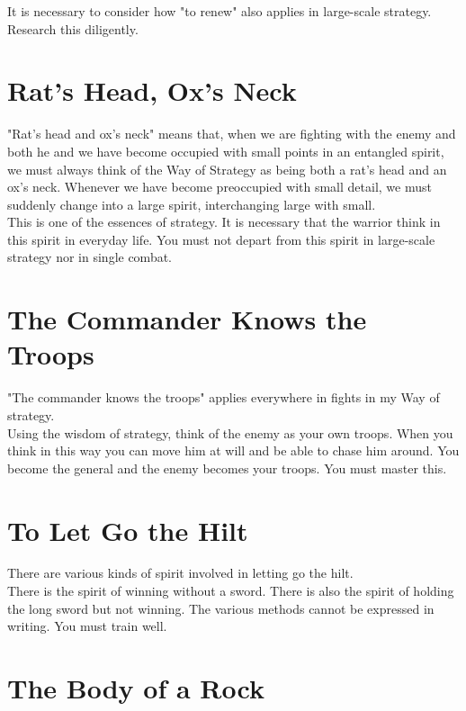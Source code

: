It is necessary to consider how "to renew" also applies in large-scale strategy. Research this diligently.\\
\section{Rat's Head, Ox's Neck}

"Rat's head and ox's neck" means that, when we are fighting with the enemy and both he and we have become occupied with small points in an entangled spirit, we must always think of the Way of Strategy as being both a rat's head and an ox's neck. Whenever we have become preoccupied with small detail, we must suddenly change into a large spirit, interchanging large with small.\\

This is one of the essences of strategy. It is necessary that the warrior think in this spirit in everyday life. You must not depart from this spirit in large-scale strategy nor in single combat.\\
\section{The Commander Knows the Troops}

"The commander knows the troops" applies everywhere in fights in my Way of strategy.\\

Using the wisdom of strategy, think of the enemy as your own troops. When you think in this way you can move him at will and be able to chase him around. You become the general and the enemy becomes your troops. You must master this.\\
\section{To Let Go the Hilt}

There are various kinds of spirit involved in letting go the hilt.\\

There is the spirit of winning without a sword. There is also the spirit of holding the long sword but not winning. The various methods cannot be expressed in writing. You must train well.\\
\section{The Body of a Rock}


